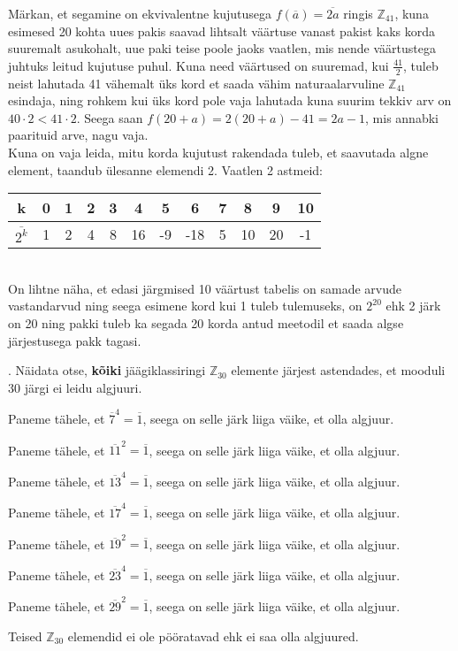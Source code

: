 \documentclass[a4paper, 10pt]{article}
\newcommand{\Z}{\mathbb{Z}}
\newcommand{\w}{\overline}
\begin{document}
\bigskip
Märkan, et segamine on ekvivalentne kujutusega $f(\w a)=\w{2a}$ ringis $\Z_{41}$, kuna esimesed 20 kohta uues pakis saavad lihtsalt väärtuse vanast pakist kaks korda suuremalt asukohalt, uue paki teise poole jaoks vaatlen, mis nende väärtustega juhtuks leitud kujutuse puhul. Kuna need väärtused on suuremad, kui $\frac{41}{2}$, tuleb neist lahutada 41 vähemalt üks kord et saada vähim naturaalarvuline $\Z_{41}$ esindaja, ning rohkem kui üks kord pole vaja lahutada kuna suurim tekkiv arv on $40\cdot2<41\cdot2$. Seega saan $f(20+a)=2(20+a)-41=2a-1$, mis annabki paarituid arve, nagu vaja.\\
\indent Kuna on vaja leida, mitu korda kujutust rakendada tuleb, et saavutada algne element, taandub ülesanne elemendi 2. Vaatlen 2 astmeid:\\
\begin{tabular}{c|c|c|c|c|c|c|c|c|c|c|c}
k&0&1&2&3&4&5&6&7&8&9&10\\
\hline
$\w{2^k}$&1&2&4&8&16&-9&-18&5&10&20&-1
\end{tabular}\\
On lihtne näha, et edasi järgmised 10 väärtust tabelis on samade arvude vastandarvud ning seega esimene kord kui 1 tuleb tulemuseks, on $2^20$ ehk 2 järk on 20 ning pakki tuleb ka segada 20 korda antud meetodil et saada algse järjestusega pakk tagasi.
\bigskip

. Näidata otse, {\bf kõiki} jäägiklassiringi $\mathbb{Z}_{30}$ elemente järjest astendades, et mooduli $30$ järgi ei leidu algjuuri. 

\bigskip
Paneme tähele, et  $\w{7}^{4}=\w{1}$, seega on selle järk liiga väike, et olla algjuur. 

Paneme tähele, et  $\w{11}^{2}=\w{1}$, seega on selle järk liiga väike, et olla algjuur. 

Paneme tähele, et  $\w{13}^{4}=\w{1}$, seega on selle järk liiga väike, et olla algjuur. 

Paneme tähele, et  $\w{17}^{4}=\w{1}$, seega on selle järk liiga väike, et olla algjuur. 

Paneme tähele, et  $\w{19}^{2}=\w{1}$, seega on selle järk liiga väike, et olla algjuur. 

Paneme tähele, et  $\w{23}^{4}=\w{1}$, seega on selle järk liiga väike, et olla algjuur. 

Paneme tähele, et  $\w{29}^{2}=\w{1}$, seega on selle järk liiga väike, et olla algjuur. 

Teised $\Z_{30}$ elemendid ei ole pööratavad ehk ei saa olla algjuured.
\bigskip
\end{document}
